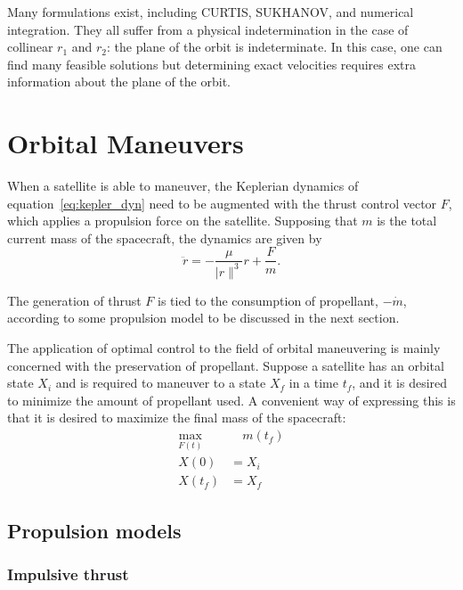 Many formulations exist, including CURTIS, SUKHANOV, and numerical integration. They all suffer from a physical indetermination in the case of collinear \(r_1\) and \(r_2\): the plane of the orbit is indeterminate. In this case, one can find many feasible solutions but determining exact velocities requires extra information about the plane of the orbit.\


\section{Orbital Maneuvers}

When a satellite is able to maneuver, the Keplerian dynamics of equation~\eqref{eq:kepler_dyn} need to be augmented with the thrust control vector \(F\), which applies a propulsion force on the satellite. Supposing that \(m\) is the total current mass of the spacecraft, the dynamics are given by
\begin{equation}
    \ddot r = -\frac{\mu}{\lvert r \rVert^3}r + \frac{F}{m}.
\end{equation}

The generation of thrust \(F\) is tied to the consumption of propellant, \(-\dot m\), according to some propulsion model to be discussed in the next section.

The application of optimal control to the field of orbital maneuvering is mainly concerned with the preservation of propellant. Suppose a satellite has an orbital state \(X_i\) and is required to maneuver to a state \(X_f\) in a time \(t_f\), and it is desired to minimize the amount of propellant used. A convenient way of expressing this is that it is desired to maximize the final mass of the spacecraft:
\begin{align}
    \max_{F(t)}&\quad m(t_f) \label{eq:max_final_mass} \\
    X(0) &= X_i \\
    X(t_f) &= X_f
\end{align}

\subsection{Propulsion models}

\subsubsection{Impulsive thrust}

